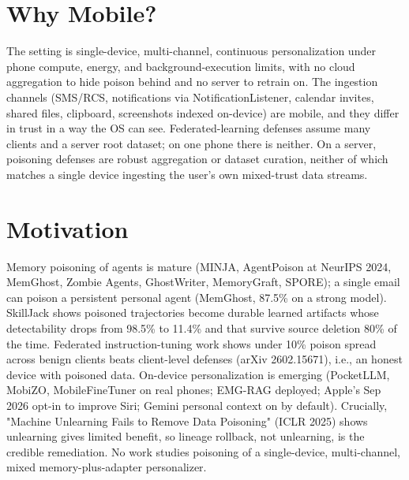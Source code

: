 \documentclass[11pt]{article}
\begin{document}
\section{Why Mobile?}
The setting is single-device, multi-channel, continuous personalization under phone compute, energy, and background-execution limits, with no cloud aggregation to hide poison behind and no server to retrain on. The ingestion channels (SMS/RCS, notifications via NotificationListener, calendar invites, shared files, clipboard, screenshots indexed on-device) are mobile, and they differ in trust in a way the OS can see. Federated-learning defenses assume many clients and a server root dataset; on one phone there is neither. On a server, poisoning defenses are robust aggregation or dataset curation, neither of which matches a single device ingesting the user's own mixed-trust data streams.

\section{Motivation}
Memory poisoning of agents is mature (MINJA, AgentPoison at NeurIPS 2024, MemGhost, Zombie Agents, GhostWriter, MemoryGraft, SPORE); a single email can poison a persistent personal agent (MemGhost, 87.5\% on a strong model). SkillJack shows poisoned trajectories become durable learned artifacts whose detectability drops from 98.5\% to 11.4\% and that survive source deletion 80\% of the time. Federated instruction-tuning work shows under 10\% poison spread across benign clients beats client-level defenses (arXiv 2602.15671), i.e., an honest device with poisoned data. On-device personalization is emerging (PocketLLM, MobiZO, MobileFineTuner on real phones; EMG-RAG deployed; Apple's Sep 2026 opt-in to improve Siri; Gemini personal context on by default). Crucially, "Machine Unlearning Fails to Remove Data Poisoning" (ICLR 2025) shows unlearning gives limited benefit, so lineage rollback, not unlearning, is the credible remediation. No work studies poisoning of a single-device, multi-channel, mixed memory-plus-adapter personalizer.
\end{document}
